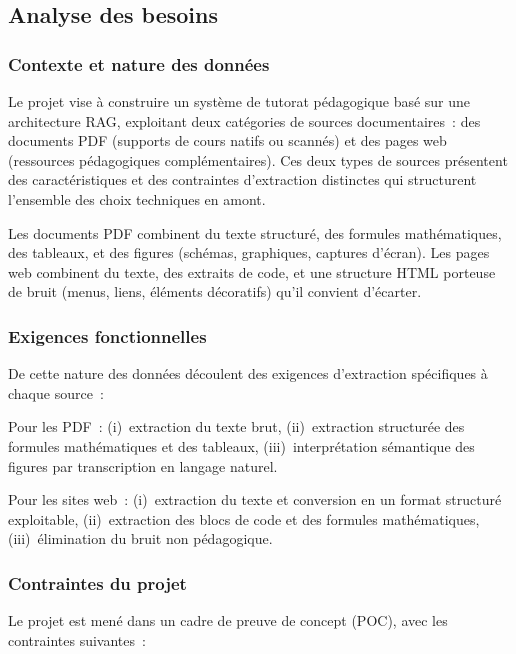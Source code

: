\documentclass[11pt,a4paper]{article}
\begin{document}
\subsection{Analyse des besoins}

\subsubsection{Contexte et nature des données}

Le projet vise à construire un système de tutorat pédagogique basé sur une architecture RAG, exploitant deux catégories de sources documentaires~: des documents PDF (supports de cours natifs ou scannés) et des pages web (ressources pédagogiques complémentaires). Ces deux types de sources présentent des caractéristiques et des contraintes d'extraction distinctes qui structurent l'ensemble des choix techniques en amont.

Les documents PDF combinent du texte structuré, des formules mathématiques, des tableaux, et des figures (schémas, graphiques, captures d'écran). Les pages web combinent du texte, des extraits de code, et une structure HTML porteuse de bruit (menus, liens, éléments décoratifs) qu'il convient d'écarter.

\subsubsection{Exigences fonctionnelles}

De cette nature des données découlent des exigences d'extraction spécifiques à chaque source~:

Pour les PDF~: (i)~extraction du texte brut, (ii)~extraction structurée des formules mathématiques et des tableaux, (iii)~interprétation sémantique des figures par transcription en langage naturel.

Pour les sites web~: (i)~extraction du texte et conversion en un format structuré exploitable, (ii)~extraction des blocs de code et des formules mathématiques, (iii)~élimination du bruit non pédagogique.

\subsubsection{Contraintes du projet}

Le projet est mené dans un cadre de preuve de concept (POC), avec les contraintes suivantes~:
\end{document}
